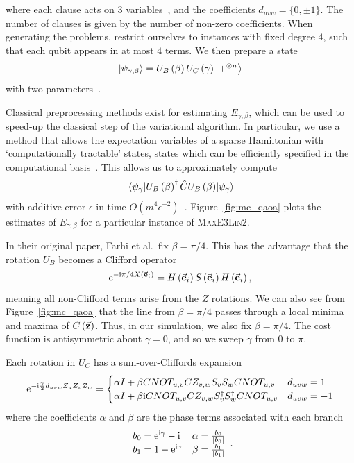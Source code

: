 where each clause acts on $3$ variables~\cite{Farhi2014b,Bravyi2018}, and the coefficients $d_{uvw}=\{0,\pm1\}$. The number of clauses is given by the number of non-zero coefficients. When generating the problems, restrict ourselves to instances with fixed degree $4$, such that each qubit appears in at most $4$ terms. We then prepare a state 
\[\ket{\psi_{\gamma,\beta}} = U_{B}\left(\beta\right)U_{C}\left(\gamma\right)\ket{+^{\otimes n}}\]
with two parameters~\cite{Farhi2014b}.\par
Classical preprocessing methods exist for estimating $E_{\gamma,\beta}$, which can be used to speed-up the classical step of the variational algorithm. In particular, we use a method that allows the expectation variables of a sparse Hamiltonian with `computationally tractable' states, states which can be efficiently specified in the computational basis~\cite{VandenNest2009}. This allows us to approximately compute
\[\matrixel{\psi_{\gamma}}{U_{B}\left(\beta\right)^{\dagger} \hat{C}U_{B}\left(\beta\right)}{\psi_{\gamma}}\]
with additive error $\epsilon$ in time $O(m^{4}\epsilon^{-2})$~\cite{Bravyi2018}. Figure~\ref{fig:mc_qaoa} plots the estimates of $E_{\gamma,\beta}$ for a particular instance of \textsc{MaxE3Lin2}.\par
In their original paper, Farhi et al.\ fix $\beta=\pi/4$. This has the advantage that the rotation $U_{B}$ becomes a Clifford operator 
\[\mathrm{e}^{-\mathrm{i} \pi/4 X\left(\va{e}_{i}\right)}=H\left(\va{e}_{i}\right)S\left(\va{e}_{i}\right)H\left(\va{e}_{i}\right),\]
meaning all non-Clifford terms arise from the $Z$ rotations. We can also see from Figure~\ref{fig:mc_qaoa} that the line from $\beta=\pi/4$ passes through a local minima and maxima of $C\left(\va{z}\right)$. Thus, in our simulation, we also fix $\beta=\pi/4$. The cost function is antisymmetric about $\gamma=0$, and so we sweep $\gamma$ from $0$ to $\pi$.\par
Each rotation in $U_{C}$ has a sum-over-Cliffords expansion~\cite{Bravyi2018}
\[\mathrm{e}^{-\mathrm{i} \frac{\gamma}{2} d_{uvw}Z_{u}Z_{v}Z_{w}} = \begin{cases}
\alpha I + \beta CNOT_{u,v}CZ_{v,w}S_{v}S_{w}CNOT_{u,v} & d_{uvw} = 1\\
\alpha I + \beta \mathrm{i} CNOT_{u,v}CZ_{v,w}S^{\dagger}_{v}S^{\dagger}_{w}CNOT_{u,v} & d_{uvw} = -1\\
\end{cases}\]
where the coefficients $\alpha$ and $\beta$ are the phase terms associated with each branch
\[\begin{array}{lr}
b_{0} = \mathrm{e}^{\mathrm{i} \gamma}-\mathrm{i} & \alpha = \frac{b_{0}}{\left|b_{0}\right|}\\
b_{1} = 1 - \mathrm{e}^{\mathrm{i} \gamma} & \beta = \frac{b_{1}}{\left|b_{1}\right|}\\
\end{array}.\]
